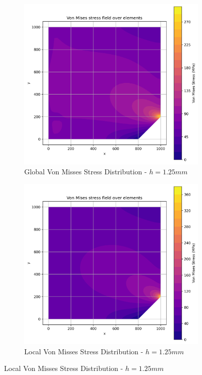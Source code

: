 \begin{figure}[H]
  \centering
  \begin{subfigure}[b]{0.45\textwidth}
    \centering
    \includegraphics[width=\textwidth]{GRAFICOS/Quad9/1.25mm_global/resultados_von_mises.png}
    \caption{Global Von Misses Stress Distribution - $h=1.25mm$}
    \label{fig:img13}
  \end{subfigure}
  \hfill
  \begin{subfigure}[b]{0.45\textwidth}
    \centering
    \includegraphics[width=\textwidth]{GRAFICOS/Quad9/1.25mm_local/resultados_von_mises.png}
    \caption{Local Von Misses Stress Distribution - $h=1.25mm$}
    \label{fig:img23}
  \end{subfigure}
\end{figure}

